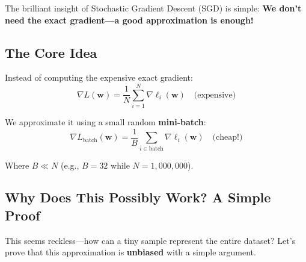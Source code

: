 \documentclass[11pt]{article}
\newcommand{\w}{\mathbf{w}}
\begin{document}
The brilliant insight of Stochastic Gradient Descent (SGD) is simple: \textbf{We don't need the exact gradient—a good approximation is enough!}

\subsection{The Core Idea}
Instead of computing the expensive exact gradient:
\begin{equation}
\nabla L(\w) = \frac{1}{N} \sum_{i=1}^{N} \nabla \ell_i(\w) \quad \text{(expensive)}
\end{equation}

We approximate it using a small random \textbf{mini-batch}:
\begin{equation}
\nabla L_{\text{batch}}(\w) = \frac{1}{B} \sum_{i \in \text{batch}} \nabla \ell_i(\w) \quad \text{(cheap!)}
\end{equation}

Where $B \ll N$ (e.g., $B = 32$ while $N = 1,000,000$).

\subsection{Why Does This Possibly Work? A Simple Proof}
This seems reckless—how can a tiny sample represent the entire dataset? Let's prove that this approximation is \textbf{unbiased} with a simple argument.
\end{document}

